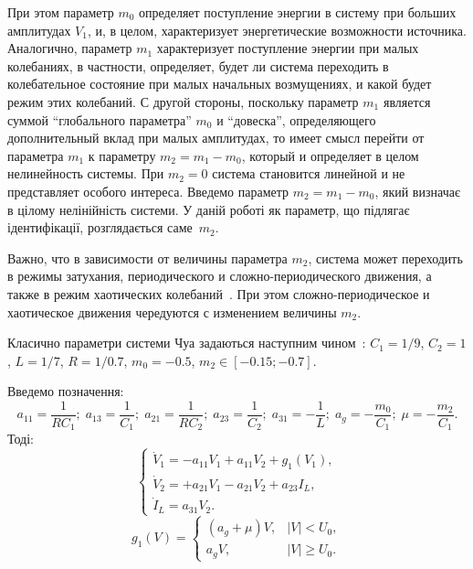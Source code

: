 При этом параметр \(m_0\) определяет поступление энергии в систему
при больших амплитудах \(V_1\), и, в целом, характеризует
энергетические возможности источника.
Аналогично, параметр \(m_1\) характеризует поступление энергии
при малых колебаниях, в частности, определяет, будет ли
система переходить в колебательное состояние при малых начальных
возмущениях, и какой будет режим этих колебаний.
С другой стороны, поскольку параметр \(m_1\) является суммой
``глобального параметра'' \(m_0\) и ``довеска'',
определяющего дополнительный вклад при малых амплитудах,
то имеет смысл перейти от параметра \(m_1\) к параметру
\( m_2 = m_1 - m_0 \), который
и определяет в целом нелинейность
системы. При \( m_2 = 0 \) система становится линейной
и не представляет особого интереса.
%
Введемо параметр \(m_2 = m_1 - m_0 \), який визначає в цілому нелінійність системи.
У даній роботі як параметр, що підлягає ідентифікації, розглядається саме~$m_2$.

Важно, что в зависимости от величины параметра $m_2$,
система может переходить в режимы затухания,
периодического и сложно-периодического движения, а также в режим
хаотических колебаний~\cite{anisch_nonlin_eff,magni_new_meth,Chua_double_scroll}.
При этом сложно-периодическое и хаотическое
движения чередуются с изменением величины \(m_2\).


Класично параметри системи Чуа задаються наступним чином~\cite{buga_chua}:
$C_1 = 1/9$, $C_2 = 1$, $L= 1/7$, $R = 1/0.7$, $m_0=-0.5$, $ m_2 \in [ -0.15; -0.7 ] $.

Введемо позначення:
\[
  a_{11} = \frac{1}{R C_1}; \;
  a_{13} = \frac{1}{C_1}; \;
  a_{21} = \frac{1}{R C_2}; \;
  a_{23} = \frac{1}{C_2}; \;
  a_{31} = -\frac{1}{L}; \;
  a_g = - \frac{m_0}{C_1}; \;
  \mu = - \frac{m_2}{C_1}.
\]
%
Тоді:
%
\begin{equation}
\begin{cases}
  \dot{V}_1  = -a_{11} V_1 + a_{11}  V_2  + g_1(V_1) , \\
  \dot{V}_2  = +a_{21} V_1 - a_{21}  V_2  + a_{23} I_L    , \\
  \dot{I}_L  =  a_{31} V_2.
\end{cases}
\label{atu:eq:chua2}
\end{equation}
%
%
\begin{equation}
g_1(V) =
\begin{cases}
  ( a_g + \mu ) V , & |V| <   U_0, \\
  a_g V           , & |V| \ge U_0.
\end{cases}
\label{atu:eq:diodchua2}
\end{equation}

